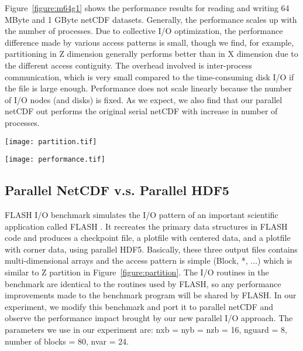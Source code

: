 \documentclass[10pt,twocolumn]{article}          %
\begin{document}
Figure~\ref{figure:m64g1} shows the performance results for reading and writing 64 MByte and 1
GByte netCDF datasets. Generally, the performance scales up with the number of processes. Due to
collective I/O optimization, the performance difference made by various access patterns is small,
though we find, for example, partitioning in Z dimension generally performs better than in X
dimension due to the different access contiguity. The overhead involved is inter-process
communication, which is very small compared to the time-consuming disk I/O if the file is large
enough. Performance does not scale linearly because the number of I/O nodes (and disks) is fixed.
As we expect, we also find that our parallel netCDF out performs the original serial netCDF with
increase in number of processes.

\begin{figure*}
\begin{center}
\texttt{[image: partition.tif]}
\end{center}
\vskip -0.1in \caption{Example of Field Array Partitions on 8
Processors} \label{figure:partition}
\end{figure*}

\begin{figure*}
\begin{center}
\texttt{[image: performance.tif]}
\end{center}
\vskip -0.1in \caption{Parallel NetCDF Performance for 64MBytes \&
1GBytes Datasets} \label{figure:m64g1}
\end{figure*}

\subsection{Parallel NetCDF v.s. Parallel HDF5}

FLASH I/O benchmark simulates the I/O pattern of an important
scientific application called FLASH \cite{FORT00}. It recreates
the primary data structures in FLASH code and produces a
checkpoint file, a plotfile with centered data, and a plotfile
with corner data, using parallel HDF5. Basically, these three
output files contains multi-dimensional arrays and the access
pattern is simple (Block, *, ...) which is similar to Z partition
in Figure~\ref{figure:partition}. The I/O routines in the
benchmark are identical to the routines used by FLASH, so any
performance improvements made to the benchmark program will be
shared by FLASH. In our experiment, we modify this benchmark and
port it to parallel netCDF and observe the performance impact
brought by our new parallel I/O approach. The parameters we use in
our experiment are: nxb = nyb = nzb = 16, nguard = 8, number of
blocks = 80, nvar = 24.
\end{document}
